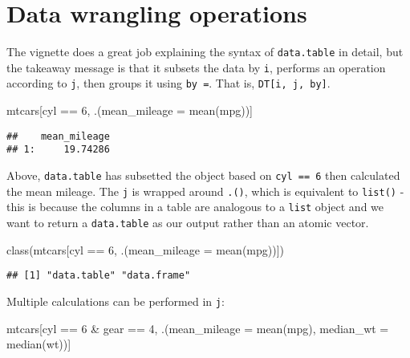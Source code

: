 \documentclass[
]{book}
\newenvironment{Shaded}{\begin{snugshade}}{\end{snugshade}}
\newcommand{\AttributeTok}[1]{\textcolor[rgb]{0.77,0.63,0.00}{#1}}
\newcommand{\DecValTok}[1]{\textcolor[rgb]{0.00,0.00,0.81}{#1}}
\newcommand{\FunctionTok}[1]{\textcolor[rgb]{0.00,0.00,0.00}{#1}}
\newcommand{\NormalTok}[1]{#1}
\newcommand{\SpecialCharTok}[1]{\textcolor[rgb]{0.00,0.00,0.00}{#1}}
\begin{document}
\hypertarget{data-wrangling-operations}{%
\section{Data wrangling operations}\label{data-wrangling-operations}}

The vignette does a great job explaining the syntax of \texttt{data.table} in detail, but the takeaway message is that it subsets the data by \texttt{i}, performs an operation according to \texttt{j}, then groups it using \texttt{by\ =}. That is, \texttt{DT{[}i,\ j,\ by{]}}.

\begin{Shaded}
\begin{Highlighting}[]
\NormalTok{mtcars[cyl }\SpecialCharTok{==} \DecValTok{6}\NormalTok{, .(}\AttributeTok{mean\_mileage =} \FunctionTok{mean}\NormalTok{(mpg))]}
\end{Highlighting}
\end{Shaded}

\begin{verbatim}
##    mean_mileage
## 1:     19.74286
\end{verbatim}

Above, \texttt{data.table} has subsetted the object based on \texttt{cyl\ ==\ 6} then calculated the mean mileage. The \texttt{j} is wrapped around \texttt{.()}, which is equivalent to \texttt{list()} - this is because the columns in a table are analogous to a \texttt{list} object and we want to return a \texttt{data.table} as our output rather than an atomic vector.

\begin{Shaded}
\begin{Highlighting}[]
\FunctionTok{class}\NormalTok{(mtcars[cyl }\SpecialCharTok{==} \DecValTok{6}\NormalTok{, .(}\AttributeTok{mean\_mileage =} \FunctionTok{mean}\NormalTok{(mpg))])}
\end{Highlighting}
\end{Shaded}

\begin{verbatim}
## [1] "data.table" "data.frame"
\end{verbatim}

Multiple calculations can be performed in \texttt{j}:

\begin{Shaded}
\begin{Highlighting}[]
\NormalTok{mtcars[cyl }\SpecialCharTok{==} \DecValTok{6} \SpecialCharTok{\&}\NormalTok{ gear }\SpecialCharTok{==} \DecValTok{4}\NormalTok{, .(}\AttributeTok{mean\_mileage =} \FunctionTok{mean}\NormalTok{(mpg), }\AttributeTok{median\_wt =} \FunctionTok{median}\NormalTok{(wt))]}
\end{Highlighting}
\end{Shaded}
\end{document}
